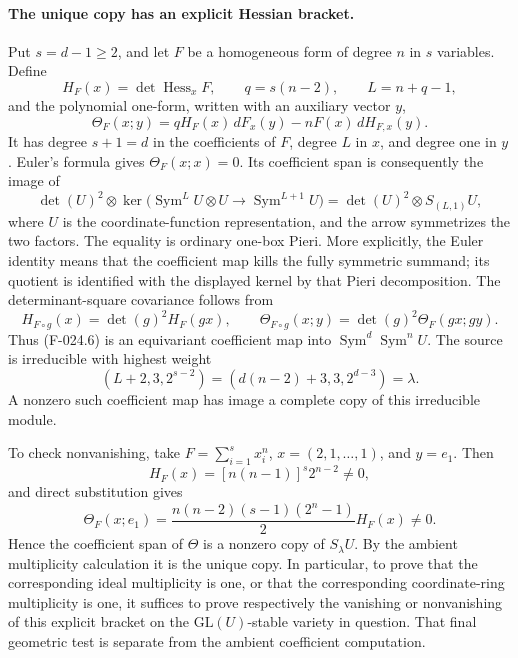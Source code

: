 \paragraph{The unique copy has an explicit Hessian bracket.}
Put \(s=d-1\geq2\), and let \(F\) be a homogeneous
form of degree \(n\) in \(s\) variables. Define
\[
 H_F(x)=\det\operatorname{Hess}_x F,
           \qquad q=s(n-2),\qquad L=n+q-1,
\]
and the polynomial one-form, written with an auxiliary vector
\(y\),
\[
 \Theta_F(x;y)=qH_F(x)\,dF_x(y)-nF(x)\,dH_{F,x}(y).
                                                               \tag{F-024.5}
\]
It has degree \(s+1=d\) in the coefficients of \(F\),
degree \(L\) in \(x\), and degree one in \(y\).
Euler's formula gives \(\Theta_F(x;x)=0\).
Its coefficient span is consequently the image of
\[
 \det(U)^2\otimes
 \ker\bigl(\operatorname{Sym}^L U\otimes U
                       \longrightarrow\operatorname{Sym}^{L+1}U\bigr)
       =\det(U)^2\otimes S_{(L,1)}U,
                                                               \tag{F-024.6}
\]
where \(U\) is the coordinate-function representation,
and the arrow symmetrizes the two factors. The equality is
ordinary one-box Pieri. More explicitly, the Euler identity
means that the coefficient map kills the fully symmetric
summand; its quotient is identified with the displayed
kernel by that Pieri decomposition. The determinant-square covariance
follows from
\[
 H_{F\circ g}(x)=\det(g)^2H_F(gx),\qquad
 \Theta_{F\circ g}(x;y)=\det(g)^2\Theta_F(gx;gy).
\]
Thus (F-024.6) is an equivariant coefficient map into
\(\operatorname{Sym}^d\operatorname{Sym}^n U\).
The source is irreducible with highest weight
\[
  (L+2,3,2^{s-2})=(d(n-2)+3,3,2^{d-3})=\lambda.
\]
A nonzero such coefficient map has image a complete copy
of this irreducible module.

To check nonvanishing, take \(F=\sum_{i=1}^s x_i^n\),
\(x=(2,1,\ldots,1)\), and \(y=e_1\). Then
\[
 H_F(x)=[n(n-1)]^s2^{n-2}\ne0,
\]
and direct substitution gives
\[
 \Theta_F(x;e_1)
   =\frac{n(n-2)(s-1)(2^n-1)}2 H_F(x)\ne0.
                                                               \tag{F-024.7}
\]
Hence the coefficient span of \(\Theta\) is a nonzero
copy of \(S_\lambda U\). By the ambient multiplicity
calculation it is the unique copy. In particular, to prove
that the corresponding ideal multiplicity is one, or that
the corresponding coordinate-ring multiplicity is one, it
suffices to prove respectively the vanishing or nonvanishing
of this explicit bracket on the \(\mathrm{GL}(U)\)-stable
variety in question.
That final geometric test is separate from the ambient
coefficient computation.

